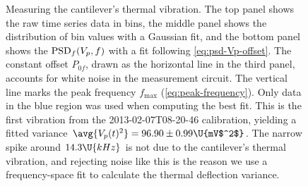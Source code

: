\begin{figure}
  \begin{center}
    \caption{\protect{}Measuring
      the cantilever's thermal vibration.  The top panel shows the raw
      time series data in bins, the middle panel shows the
      distribution of bin values with a Gaussian fit, and the bottom
      panel shows the $\operatorname{PSD}_f(V_p,f)$ with a fit following
      \cref{eq:psd-Vp-offset}.  The constant offset $P_{0f}$, drawn as
      the horizontal line in the third panel, accounts for white noise
      in the measurement circuit\citep{burnham03}.  The vertical line
      marks the peak frequency $f_\text{max}$
      (\cref{eq:peak-frequency}).  Only data in the blue region was
      used when computing the best fit.  This is the first vibration
      from the 2013-02-07T08-20-46 calibration, yielding a fitted
      variance $\avg{V_p(t)^2}=96.90\pm0.99\U{mV$^2$}$.  The narrow
      spike around $14.3\U{kHz}$ is not due to the cantilever's
      thermal vibration, and rejecting noise like this is the reason
      we use a frequency-space fit to calculate the thermal deflection
      variance.
      \label{fig:calibcant:vibration}}
  \end{center}
\end{figure}

